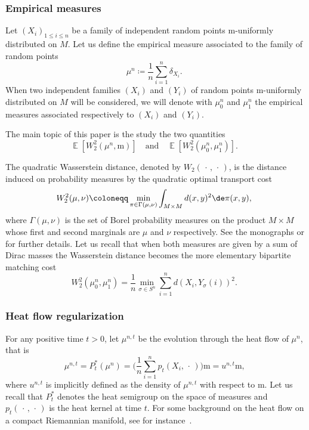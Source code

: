 \documentclass[JEP,XML,SOM,Unicode]{cedram}
\theoremstyle{plain}
\theoremstyle{definition}
\numberwithin{equation}{section}
\newcommand{\defeq}{\ensuremath{\coloneqq}}
\newcommand{\E}[1]{\ensuremath{\operatorname{\mathbb{E}}\left[#1\right]}}
\newcommand{\emptyparam}{\ensuremath{\,\cdot\,}}
\renewcommand{\comma}{\ensuremath{\text{, }}}
\newcommand{\comma}{\ensuremath{\text{, }}}
\newcommand{\fullstop}{\ensuremath{\text{. }}}
\newcommand{\m}{\ensuremath{\mathrm m}}
\begin{document}
\subsubsection{Empirical measures}
Let $(X_i)_{1\le i\le n}$ be a family of independent random points $\m$-uniformly distributed on $M$.
Let us define the empirical measure associated to the family of random points
\begin{equation*}
\mu^n \defeq \frac1n \sum_{i=1}^n \delta_{X_i} \fullstop
\end{equation*}
When two independent families $(X_i)$ and $(Y_i)$ of random points $\m$-uniformly distributed on $M$ will
be considered, we will denote with $\mu_0^n$ and $\mu_1^n$ the empirical measures associated respectively to
$(X_i)$ and $(Y_i)$.

The main topic of this paper is the study the two quantities
\begin{equation*}
\E{W_2^2(\mu^n, \m)} \quad\text{and}\quad \E{W_2^2(\mu_0^n, \mu_1^n)} \fullstop
\end{equation*}

The quadratic Wasserstein distance, denoted by $W_2(\emptyparam, \emptyparam)$, is the distance induced on
probability measures by the quadratic optimal transport cost
\begin{equation*}
W_2^2(\mu, \nu) \defeq \min_{\pi\in\Gamma(\mu, \nu)} \int_{M\times M} d(x, y)^2\de\pi(x, y) \comma
\end{equation*}
where $\Gamma(\mu,\nu)$ is the set of Borel probability measures on the product $M\times M$ whose first and
second marginals are $\mu$ and $\nu$ respectively. See the monographs \cite{Villani09} or \cite{Santambrogio15} for
further details.
Let us recall that when both measures are given by a sum of Dirac masses the Wasserstein distance becomes the
more elementary bipartite matching cost
\begin{equation*}
W_2^2(\mu_0^n, \mu_1^n) = \frac1n \min_{\sigma\in S^n}\sum_{i=1}^n d\left(X_i, Y_\sigma(i)\right)^2 \fullstop
\end{equation*}

\subsubsection{Heat flow regularization}\label{subsec:heat_flow_reg}
For any positive time $t>0$, let $\mu^{n,t}$ be the evolution through the heat flow of $\mu^n$, that is
\begin{equation*}
\mu^{n,t} = P^*_t(\mu^n) = \biggl(\frac1n \sum_{i=1}^n p_t(X_i, \emptyparam)\biggr)\m = u^{n,t}\m \comma
\end{equation*}
where $u^{n,t}$ is implicitly defined as the density of $\mu^{n,t}$ with respect to $\m$. Let us recall that
$P_t^*$ denotes the heat semigroup on the space of measures and $p_t(\emptyparam,\emptyparam)$ is the
heat kernel at time $t$. For some background on the heat flow on a compact Riemannian manifold,
see for instance~\cite[Chap.\,6]{Chavel84}.
\end{document}
